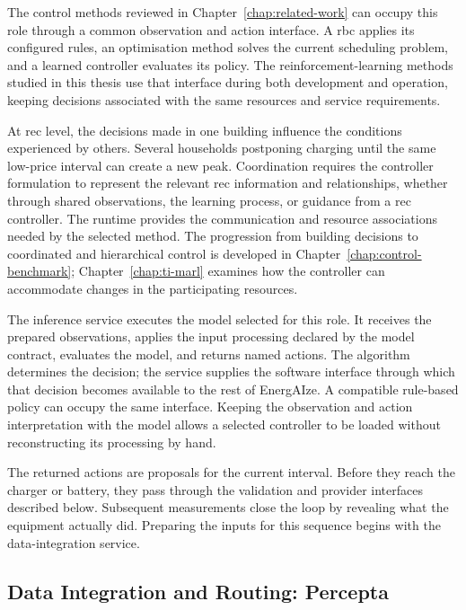 The control methods reviewed in Chapter~\ref{chap:related-work} can occupy this role through a common observation and action interface. A \gls{rbc} applies its configured rules, an optimisation method solves the current scheduling problem, and a learned controller evaluates its policy. The reinforcement-learning methods studied in this thesis use that interface during both development and operation, keeping decisions associated with the same resources and service requirements.

At \gls{rec} level, the decisions made in one building influence the conditions experienced by others. Several households postponing charging until the same low-price interval can create a new peak. Coordination requires the controller formulation to represent the relevant \gls{rec} information and relationships, whether through shared observations, the learning process, or guidance from a \gls{rec} controller. The runtime provides the communication and resource associations needed by the selected method. The progression from building decisions to coordinated and hierarchical control is developed in Chapter~\ref{chap:control-benchmark}; Chapter~\ref{chap:ti-marl} examines how the controller can accommodate changes in the participating resources.

The inference service executes the model selected for this role. It receives the prepared observations, applies the input processing declared by the model contract, evaluates the model, and returns named actions. The algorithm determines the decision; the service supplies the software interface through which that decision becomes available to the rest of EnergAIze. A compatible rule-based policy can occupy the same interface. Keeping the observation and action interpretation with the model allows a selected controller to be loaded without reconstructing its processing by hand.

The returned actions are proposals for the current interval. Before they reach the charger or battery, they pass through the validation and provider interfaces described below. Subsequent measurements close the loop by revealing what the equipment actually did. Preparing the inputs for this sequence begins with the data-integration service.

\subsection{Data Integration and Routing: Percepta}
\label{sec:energaize-percepta}

